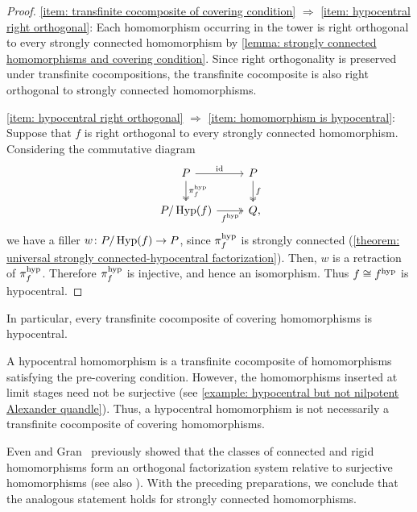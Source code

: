 \begin{proof}
\ref{item: transfinite cocomposite of covering condition} $\Rightarrow$ \ref{item: hypocentral right orthogonal}:
Each homomorphism occurring in the tower is right orthogonal to every strongly connected homomorphism by \cref{lemma: strongly connected homomorphisms and covering condition}. Since right orthogonality is preserved under transfinite cocompositions, the transfinite cocomposite is also right orthogonal to strongly connected homomorphisms.

\ref{item: hypocentral right orthogonal} $\Rightarrow$ \ref{item: homomorphism is hypocentral}:
Suppose that $f$ is right orthogonal to every strongly connected homomorphism. Considering the commutative diagram
\[\begin{tikzcd}
P \arrow[r, "\id"] \arrow[d, two heads, "\hypMap{f}"]
    & P \arrow[d, two heads, "f"]\\
P/\Hyp(f) \arrow[r, two heads, "\hypFac{f}"']
    & Q\rlap{,}
\end{tikzcd}\]
we have a filler $w\colon P/\operatorname{Hyp}(f) \to P$, since $\pi_{f}^{\mathrm{hyp}}$ is strongly connected (\cref{theorem: universal strongly connected-hypocentral factorization}). Then, $w$ is a retraction of $\pi_{f}^{\mathrm{hyp}}$. Therefore $\pi_{f}^{\mathrm{hyp}}$ is injective, and hence an isomorphism. Thus $f\cong f^{\mathrm{hyp}}$ is hypocentral.
\end{proof}

In particular, every transfinite cocomposite of covering homomorphisms is hypocentral.

\begin{rem}
    A hypocentral homomorphism is a transfinite cocomposite of homomorphisms satisfying the pre-covering condition. However, the homomorphisms inserted at limit stages need not be surjective (see \cref{example: hypocentral but not nilpotent Alexander quandle}). Thus, a hypocentral homomorphism is not necessarily a transfinite cocomposite of covering homomorphisms.
\end{rem}

Even and Gran~\cite[Proposition 3.2]{even_gran_2014_on_factorization_systems_for_surjective_quandle_homomorphisms} previously showed that the classes of connected and rigid homomorphisms form an orthogonal factorization system relative to surjective homomorphisms (see also \cite[Proposition 2.24]{preprint_yuki_tomoki_2026_relativization_of_symmetries_on_quandles}). With the preceding preparations, we conclude that the analogous statement holds for strongly connected homomorphisms.
 

